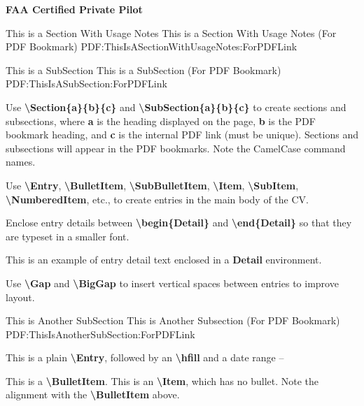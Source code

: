 \documentclass[letterpaper,MMMMyyyy,nonstopmode]{simpleresumecv}
\newcommand{\Code}[1]{\mbox{\textbf{#1}}}
\newcommand{\CodeCommand}[1]{\mbox{\textbf{\textbackslash{#1}}}}
\begin{document}
\begin{Body}
\Entry
\textbf{FAA Certified Private Pilot}

\iffalse
\newpage
\begingroup
\color{red}

\Section
{This is a\newline
Section\newline
With\newline
Usage Notes}
{This is a Section With Usage Notes (For PDF Bookmark)}
{PDF:ThisIsASectionWithUsageNotes:ForPDFLink}

\SubSection
{This is a SubSection}
{This is a SubSection (For PDF Bookmark)}
{PDF:ThisIsASubSection:ForPDFLink}

\Gap
\BulletItem
Use \CodeCommand{Section\{a\}\{b\}\{c\}} and
\CodeCommand{SubSection\{a\}\{b\}\{c\}}
to create sections and subsections, where
\Code{a} is the heading displayed on the page,
\Code{b} is the PDF bookmark heading, and
\Code{c} is the internal PDF link (must be unique).
Sections and subsections will appear in the PDF bookmarks.
Note the CamelCase command names.

\Gap
\BulletItem
Use
\CodeCommand{Entry},
\CodeCommand{BulletItem},
\CodeCommand{SubBulletItem},
\CodeCommand{Item},
\CodeCommand{SubItem},
\CodeCommand{NumberedItem},
etc.,
to create entries in the main body of the CV.

\Gap
\BulletItem
Enclose entry details between
\CodeCommand{begin\{Detail\}} and
\CodeCommand{end\{Detail\}}
so that they are typeset in a smaller font.
\begin{Detail}
\Item
This is an example of entry detail text enclosed in a \Code{Detail} environment.
\end{Detail}

\Gap
\BulletItem
Use \CodeCommand{Gap} and \CodeCommand{BigGap} to insert vertical spaces between entries to improve layout.

\BigGap
\SubSection
{This is Another SubSection}
{This is Another Subsection (For PDF Bookmark)}
{PDF:ThisIsAnotherSubSection:ForPDFLink}

\Gap
\Entry
This is a plain \CodeCommand{Entry},
followed by an \CodeCommand{hfill} and a date range
\hfill
{} --

\Gap
\BulletItem
This is a \CodeCommand{BulletItem}.
\Item
This is an \CodeCommand{Item}, which has no bullet.
Note the alignment with the \CodeCommand{BulletItem} above.


\end{Body}
\end{document}
